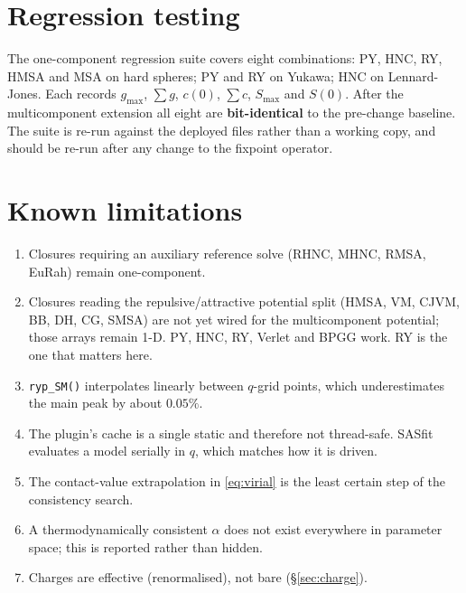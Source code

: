 \documentclass[11pt,a4paper]{article}
\newcommand{\code}[1]{\texttt{#1}}
\begin{document}
\section{Regression testing}
\label{sec:regression}

The one-component regression suite covers eight combinations: PY, HNC, RY,
HMSA and MSA on hard spheres; PY and RY on Yukawa; HNC on Lennard-Jones. Each
records $g_{\max}$, $\sum g$, $c(0)$, $\sum c$, $S_{\max}$ and $S(0)$. After
the multicomponent extension all eight are \textbf{bit-identical} to the
pre-change baseline. The suite is re-run against the deployed files rather
than a working copy, and should be re-run after any change to the fixpoint
operator.

\section{Known limitations}

\begin{enumerate}[nosep]
\item Closures requiring an auxiliary reference solve (RHNC, MHNC, RMSA,
      EuRah) remain one-component.
\item Closures reading the repulsive/attractive potential split (HMSA, VM,
      CJVM, BB, DH, CG, SMSA) are not yet wired for the multicomponent
      potential; those arrays remain 1-D. PY, HNC, RY, Verlet and BPGG work.
      RY is the one that matters here.
\item \code{ryp\_SM()} interpolates linearly between $q$-grid points, which
      underestimates the main peak by about $0.05\%$.
\item The plugin's cache is a single static and therefore not thread-safe.
      SASfit evaluates a model serially in $q$, which matches how it is
      driven.
\item The contact-value extrapolation in \eqref{eq:virial} is the least
      certain step of the consistency search.
\item A thermodynamically consistent $\alpha$ does not exist everywhere in
      parameter space; this is reported rather than hidden.
\item Charges are effective (renormalised), not bare (\S\ref{sec:charge}).
\end{enumerate}

\end{document}
